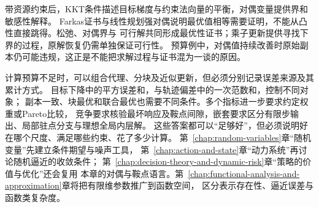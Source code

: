 带资源约束后，KKT条件描述目标梯度与约束法向量的平衡，对偶变量提供界和敏感性解释。
Farkas证书与线性规划强对偶说明最优值相等需要证明，不能从凸性直接跳得。松弛、对偶界与
可行解共同形成最优性证书；乘子更新提供寻找下界的过程，原解恢复仍需单独保证可行性。
预算例中，对偶值持续改善时原始副本仍可能违规，这正是不能把求解过程与证书混为一谈的原因。

计算预算不足时，可以组合代理、分块及近似更新，但必须分别记录误差来源及其累计方式。
目标下降中的平方误差和，与轨迹偏差中的一次范数和，控制不同对象；
副本一致、块最优和联合最优也需要不同条件。多个指标进一步要求约定权重或Pareto比较，
竞争要求核验最坏响应及鞍点间隙，嵌套要求区分有限步输出、局部驻点分支与理想全局内层解。
这些答案都可以“足够好”，但必须说明好在哪个尺度、满足哪些约束、花了多少计算。
第~\ref{chap:random-variables}章“随机变量”先建立条件期望与噪声工具，
第~\ref{chap:action-and-state}章“动力系统”再讨论随机逼近的收敛条件；
第~\ref{chap:decision-theory-and-dynamic-risk}章“策略的价值与优化”还会复用
本章的对偶与鞍点语言。第~\ref{chap:functional-analysis-and-approximation}章将把有限维参数推广到函数空间，
区分表示存在性、逼近误差与函数类复杂度。

